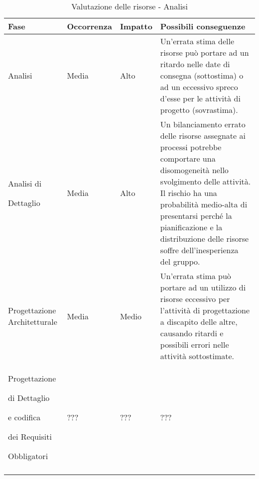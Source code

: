 \documentclass[../PianoProgetto.tex]{subfiles}
\begin{document}
	\hspace{0pt}
		\begin{longtabu} to \textwidth {X[.55] X[c .50] X[c .50] X}
			\toprule
			\textbf{Fase} & \textbf{Occorrenza} & \textbf{Impatto} & \textbf{Possibili conseguenze}\\
			\midrule
			\endhead
			
			Analisi & Media & Alto & Un'errata stima delle risorse può portare ad un ritardo nelle date di consegna (sottostima) o ad un eccessivo spreco d'esse per le attività di progetto (sovrastima). \\
			\midrule
			Analisi di \par Dettaglio & Media & Alto & Un bilanciamento errato delle risorse assegnate ai processi potrebbe comportare una disomogeneità nello svolgimento delle attività. Il rischio ha una probabilità medio-alta di presentarsi perché la pianificazione e la distribuzione delle risorse soffre dell'inesperienza del gruppo. \\
			\midrule
			Progettazione Architetturale & Media & Medio & Un'errata stima può portare ad un utilizzo di risorse eccessivo per l'attività di progettazione a discapito delle altre, causando ritardi e possibili errori nelle attività sottostimate. \\
			\midrule
			Progettazione \par di Dettaglio \par e codifica \par dei Requisiti \par Obbligatori & ??? & ??? & ???\\
			\bottomrule

		\caption{Valutazione delle risorse - Analisi}
		\label{tab:Valutazione delle risorse - Analisi}	
	\end{longtabu}
	
\end{document}
